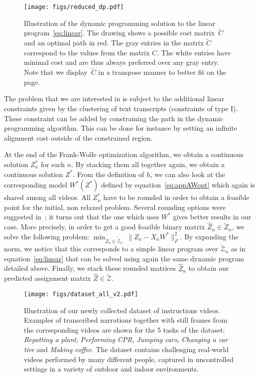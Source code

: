 \documentclass[10pt,twocolumn,letterpaper]{article}
\begin{document}
\begin{figure}[tbp]
    \centering
    \texttt{[image: figs/reduced\_dp.pdf]}


    \caption{
        Illustration of the dynamic programming solution to the linear program~\eqref{eq:linear}.
        The drawing shows a possible cost matrix~$\tilde{C}$ and an optimal path in red.
        The gray entries in the matrix $\tilde{C}$ correspond to the values from the matrix \(C\). The white entries have minimal cost and are thus always preferred over any gray entry. 
        Note that we display~$\tilde{C}$ in a transpose manner to better fit on the page.
}
    \label{fig:dp}


\end{figure}

The problem that we are interested in is subject to the additional linear constraints given by the clustering of text transcripts (constraints of type I).
These constraint can be added by constraining the path in the dynamic programming algorithm.
This can be done for instance by setting an infinite alignment cost outside of the constrained region.

At the end of the Frank-Wolfe optimization algorithm, we obtain a continuous solution $Z^*_n$ for each $n$.
By stacking them all together again, we obtain a continuous solution $Z^*$. From the definition of $h$, we can also look at the corresponding model $W^*(Z^*)$ defined by equation~\eqref{eq:appAWopt} which again is shared among all videos.
All $Z_n^*$ have to be rounded in order to obtain a feasible point for the initial, non relaxed problem.
Several rounding options were suggested in~\cite{Bojanowski15weakly}; it turns out that the one which uses $W^*$ gives better results in our case.
%
More precisely, in order to get a good feasible binary matrix $\hat{Z}_n \in \tilde{Z}_n$, we solve the following problem: $\min_{Z_n \in \tilde{\mathcal{Z}}_n} \ \|Z_n - X_n W^*\|_F^2$.
By expanding the norm, we notice that this corresponds to a simple linear program over $\tilde{\mathcal{Z}}_n$ as in equation~\eqref{eq:linear} that can be solved using again the same dynamic program detailed above.
Finally, we stack these rounded matrices $\hat{Z}_n$ to obtain our predicted assignment matrix $\hat{Z} \in \tilde{\mathcal{Z}}$.



\begin{figure*}[ht!]
       \centering
%
%
	 \texttt{[image: figs/dataset\_all\_v2.pdf]} %
%
     \caption{\small Illustration of our newly collected dataset of instructions videos. 
     Examples of transcribed narrations together with still frames from the corresponding videos are shown for the 5 tasks of the dataset: 
     {\em Repotting a plant}, {\em Performing CPR}, {\em Jumping cars}, {\em Changing a car tire} and {\em Making coffee}. 
     The dataset contains challenging real-world videos performed by many different people, captured in uncontrolled settings in a variety of outdoor and indoor environments.  
%
     }
     \label{fig:datasetApp}
 \end{figure*}
\end{document}
